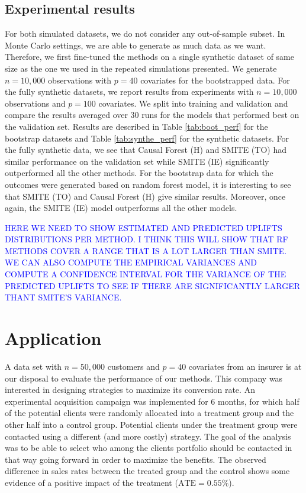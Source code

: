 \documentclass{article}
\begin{document}
\subsection{Experimental results}

For both simulated datasets, we do not consider any out-of-sample subset. In Monte Carlo settings, we are able to generate as much data as we want. Therefore, we first fine-tuned the methods on a single synthetic dataset of same size as the one we used in the repeated simulations presented. We generate $n=10,000$ observations with $p=40$ covariates for the bootstrapped data. For the fully synthetic datasets, we report results from experiments with $n=10,000$ observations and $p=100$ covariates. We split into training and validation and compare the results averaged over $30$ runs for the models that performed best on the validation set. Results are described in Table \ref{tab:boot_perf} for the bootstrap datasets and Table \ref{tab:synthe_perf} for the synthetic datasets. For the fully synthetic data, we see that Causal Forest (H) and SMITE (TO) had similar performance on the validation set while SMITE (IE) significantly outperformed all the other methods. For the bootstrap data for which the outcomes were generated based on random forest model, it is interesting to see that SMITE (TO) and Causal Forest (H) give similar results. Moreover, once again, the SMITE (IE) model outperforms all the other models.



\textcolor{blue}{HERE WE NEED TO SHOW ESTIMATED AND PREDICTED UPLIFTS DISTRIBUTIONS PER METHOD. I THINK THIS WILL SHOW THAT RF METHODS COVER A RANGE THAT IS A LOT LARGER THAN SMITE. WE CAN ALSO COMPUTE THE EMPIRICAL VARIANCES AND COMPUTE A CONFIDENCE INTERVAL FOR THE VARIANCE OF THE PREDICTED UPLIFTS TO SEE IF THERE ARE SIGNIFICANTLY LARGER THANT SMITE'S VARIANCE.}




\section{Application}
\label{sec:application}

A data set with $n=50,000$ customers and $p=40$ covariates from an insurer is at our disposal to evaluate the performance of our methods. This company was interested in designing strategies to maximize its conversion rate. An experimental acquisition campaign was implemented for 6 months, for which half of the potential clients were randomly allocated into a treatment group and the other half into a control group. Potential clients under the treatment group were contacted using a different (and more costly) strategy. The goal of the analysis was to be able to select who among the clients portfolio should be contacted in that way going forward in order to maximize the benefits. The observed difference in sales rates between the treated group and the control shows some evidence of a positive impact of the treatment ($\mathrm{ATE}=0.55\%$).
\end{document}

